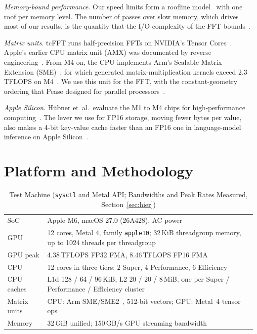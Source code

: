 \documentclass[conference]{IEEEtran}
\begin{document}
\textit{Memory-bound performance.} Our speed limits form a roofline model~\cite{williams2009roofline}
with one roof per memory level. The number of passes over slow memory, which drives most of our
results, is the quantity that the I/O complexity of the FFT bounds~\cite{hong1981io}.

\textit{Matrix units.} tcFFT runs half-precision FFTs on NVIDIA's Tensor Cores~\cite{li2021tcfft}.
Apple's earlier CPU matrix unit (AMX) was documented by reverse engineering~\cite{corsix_amx}. From
M4 on, the CPU implements Arm's Scalable Matrix Extension (SME)~\cite{arm_sme}, for which generated
matrix-multiplication kernels exceed 2.3\,TFLOPS on M4~\cite{remke2024hellosme}. We use this unit for
the FFT, with the constant-geometry ordering that Pease designed for parallel
processors~\cite{pease1968adaptation,vanloan1992fft}.

\textit{Apple Silicon.} Hübner et~al.\ evaluate the M1 to M4 chips for high-performance
computing~\cite{hubner2025apple}. The lever we use for FP16 storage, moving fewer bytes per value, also
makes a 4-bit key-value cache faster than an FP16 one in language-model inference on Apple
Silicon~\cite{bergach2026int4}.

\section{Platform and Methodology}\label{sec:platform}

\begin{table}[t]
\centering
\caption{Test Machine (\texttt{sysctl} and Metal API; Bandwidths and Peak Rates Measured,
Section~\ref{sec:hier})}
\label{tab:device}
\footnotesize
\begin{tabular}{@{}lp{}@{}}
\toprule
SoC & Apple M6, macOS 27.0 (26A428), AC power \\
GPU & 12 cores, Metal 4, family \texttt{apple10}; 32\,KiB threadgroup memory, up to 1024 threads per
threadgroup \\
GPU peak & 4.38\,TFLOPS FP32 FMA, 8.46\,TFLOPS FP16 FMA \\
CPU & 12 cores in three tiers: 2 Super, 4 Performance, 6 Efficiency \\
CPU caches & L1d 128 / 64 / 96\,KiB; L2 20 / 20 / 8\,MiB, one per Super / Performance /
Efficiency cluster \\
Matrix units & CPU: Arm SME/SME2~\cite{arm_sme}, 512-bit vectors; GPU: Metal~4 tensor ops \\
Memory & 32\,GiB unified; 150\,GB/s GPU streaming bandwidth \\
\bottomrule
\end{tabular}
\end{table}
\end{document}
